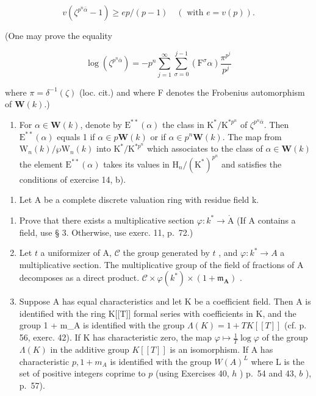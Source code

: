 \[
v \left(\zeta^ {p ^ {n} \bar {\alpha}} - 1\right) \geqslant e p / (p - 1) \quad (\text { with } e = v (p)).
\]

(One may prove the equality

\[
\log \left(\zeta^ {p ^ {n} \overline {{{\alpha}}}}\right) = - p ^ {n} \sum_ {j = 1} ^ {\infty} \sum_ {\sigma = 0} ^ {j - 1} \left(\mathrm{F} ^ {\sigma} \alpha\right) \frac {\pi^ {p ^ {j}}}{p ^ {j}}
\]

\(\text{where }\pi = \delta^{-1}(\zeta)\) (loc. cit.) and where F denotes the Frobenius automorphism of \(\mathbf{W}(k)\).)

\begin{enumerate}
\def\labelenumi{\alph{enumi})}
\setcounter{enumi}{1}
\tightlist
\item
  For \(\alpha \in \mathbf{W}(k)\), denote by \(\mathrm{E}^{**}(\alpha)\) the class in \(\mathrm{K}^* / \mathrm{K}^{*p^n}\) of \(\zeta^{p^n\overline{\alpha}}\). Then \(\mathrm{E}^{**}(\alpha)\) equals 1 if \(\alpha \in p\mathbf{W}(k)\) or if \(\alpha \in p^n\mathbf{W}(k)\). The map from \(\mathrm{W}_n(k)/\wp\mathrm{W}_n(k)\) into \(\mathrm{K}^* / \mathrm{K}^{*p^n}\) which associates to the class of \(\alpha \in \mathbf{W}(k)\) the element \(\mathrm{E}^{**}(\alpha)\) takes its values in \(\mathrm{H}_n / (\mathrm{K}^*)^{p^n}\) and satisfies the conditions of exercise 14, b).
\end{enumerate}

\begin{enumerate}
\def\labelenumi{\arabic{enumi})}
\setcounter{enumi}{15}
\tightlist
\item
  Let A be a complete discrete valuation ring with residue field k.
\end{enumerate}

\begin{enumerate}
\def\labelenumi{\alph{enumi})}
\item
  Prove that there exists a multiplicative section \(\varphi:k^{*}\to\mathring{\mathrm{A}}\) (If A contains a field, use § 3. Otherwise, use exerc. 11, p.~72.)
\item
  Let \(t\) a uniformizer of A, \(\mathcal{C}\) the group generated by \(t\) , and \(\varphi:k^{*}\to A\) a multiplicative section. The multiplicative group of the field of fractions of A decomposes as a direct product. \(\mathcal{C}\times\varphi(k^{*})\times(1+\mathfrak{m}_{\mathbf{A}})\) .
\item
  Suppose A has equal characteristics and let K be a coefficient field. Then A is identified with the ring K{[}{[}T{]}{]} formal series with coefficients in K, and the group 1 + m\_A is identified with the group \(\Lambda(K) = 1 + TK[[T]]\) (cf. p. 56, exerc. 42). If K has characteristic zero, the map \(\varphi \mapsto \frac{1}{T} \log \varphi\) of the group \(\Lambda(K)\) in the additive group \(K[[T]]\) is an isomorphism. If A has characteristic \(p, 1 + m_A\) is identified with the group \(W(A)^L\) where L is the set of positive integers coprime to \(p\) (using Exercises 40, \(h\) ) p.~54 and 43, \(b\) ), p.~57).
\end{enumerate}

